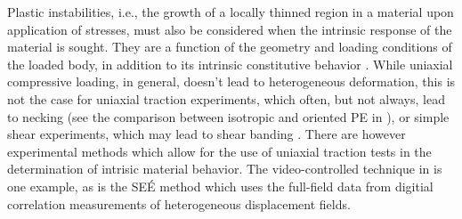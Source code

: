 Plastic instabilities, i.e., the growth of a locally thinned region in a material upon application of stresses, must also be considered when the intrinsic response of the material is sought.
They are a function of the geometry and loading conditions of the loaded body, in addition to its intrinsic constitutive behavior \citep{wardIntroductionMechanicalProperties2004}.
While uniaxial compressive loading, in general, doesn't lead to heterogeneous deformation, this is not the case for uniaxial traction experiments, which often, but not always, lead to necking (see the comparison between isotropic and oriented PE in \cite{naViscousForceDominatedTensileDeformation2006}), or simple shear experiments, which may lead to shear banding \citep{gsellApplicationPlaneSimple1983}.
There are however experimental methods which allow for the use of uniaxial traction tests in the determination of intrisic material behavior.
The video-controlled technique in \citep{gsellVideocontrolledTensileTesting1992} is one example, as is the SEÉ method \citep{lauroSEEMethodDetermination2010, balieuDamageHighStrain2015} which uses the full-field data from digitial correlation measurements of heterogeneous displacement fields.

